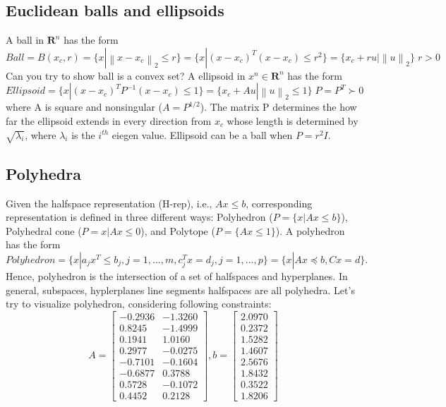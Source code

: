 \documentclass[12pt]{article}%
\begin{document}
\subsection{Euclidean balls and ellipsoids}
A ball in $\mathbf{R}^n$ has the form
\begin{equation}
    Ball = B(x_c, r) = \{x| \left \| x-x_c \right \|_2 \leq r\} = \{x|(x-x_c)^T(x-x_c) \leq r^2\} = \{x_c+ru| \left \| u \right \|_2 \}\; r>0
\end{equation} Can you try to show ball is a convex set?
A ellipsoid in $x^n \in \mathbf{R}^n$ has the form
\begin{equation}\label{ellipsoid}
    Ellipsoid = \{x | (x-x_c)^TP^{-1}(x-x_c) \leq 1\} = \{x_c+Au|\left \| u \right \|_2 \leq 1 \}\; P=P^T \succ 0
\end{equation} where A is square and nonsingular ($A=P^{1/2}$). The matrix P determines the how far the ellipsoid extends in every direction from $x_c$ whose length is determined by $\sqrt{\lambda_i}$, where $\lambda_i$ is the $i^{th}$ eiegen value. Ellipsoid can be a ball when $P=r^2I$.

\subsection{Polyhedra}
Given the halfspace representation (H-rep), i.e., $Ax \leq b$, corresponding representation is defined in three different ways: Polyhedron ($P = \{x|Ax\leq b\}$), Polyhedral cone ($P={x|Ax\leq 0}$), and Polytope ($P=\{Ax\leq 1\}$). A polyhedron has the form
\begin{equation}
    Polyhedron = \{x|a_jx^T \leq b_j, j=1,...,m, c_j^Tx =d_j, j=1,...,p\} = \{x|Ax \preceq b, Cx=d\}.
\end{equation} Hence, polyhedron is the intersection of a set of halfspaces and hyperplanes. In general, subspaces, hyplerplanes line segments halfspaces are all polyhedra. Let's try to visualize polyhedron, considering following constraints:
\begin{equation}\label{polyconst}
    A = \begin{bmatrix}
 -0.2936  & -1.3260 \\
    0.8245  & -1.4999 \\
    0.1941  &  1.0160 \\
    0.2977  & -0.0275 \\
   -0.7101  & -0.1604 \\
   -0.6877  &  0.3788 \\
    0.5728  & -0.1072 \\
    0.4452  &  0.2128 
\end{bmatrix}, b = \begin{bmatrix}
2.0970 \\
    0.2372 \\
    1.5282 \\
    1.4607 \\
    2.5676 \\
    1.8432 \\
    0.3522 \\
    1.8206 
\end{bmatrix}
\end{equation}
\end{document}
